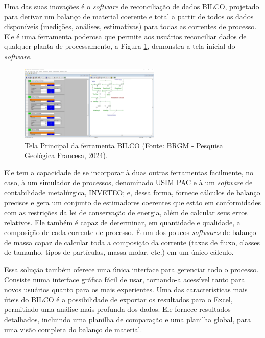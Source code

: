 Uma das suas inovações é o \textit{software} de reconciliação de dados BILCO, projetado para derivar um balanço de material coerente e total a partir de todos os dados disponíveis (medições, análises, estimativas) para todas as correntes de processo. Ele é uma ferramenta poderosa que permite aos usuários reconciliar dados de qualquer planta de processamento, a Figura \ref{fig:BILCO}, demonstra a tela inicial do \textit{software}.

\begin{figure}[htbp!]
	\centering
	\includegraphics[width=0.6\textwidth]{figuras/BILCOCASPEOP.png}
	\caption{Tela Principal da ferramenta BILCO (Fonte: BRGM - Pesquisa Geológica Francesa, 2024).}
	\label{fig:BILCO}
\end{figure}

Ele tem a capacidade de se incorporar à duas outras ferramentas facilmente, no caso, à um simulador de processos, denominado USIM PAC e à um \textit{software} de contabilidade metalúrgica, INVETEO; e, dessa forma, fornece cálculos de balanço precisos e gera um conjunto de estimadores coerentes que estão em conformidades com as restrições da lei de conservação de energia, além de calcular seus erros relativos. Ele também é capaz de determinar, em quantidade e qualidade, a composição de cada corrente de processo. É um dos poucos \textit{softwares} de balanço de massa capaz de calcular toda a composição da corrente (taxas de fluxo, classes de tamanho, tipos de partículas, massa molar, etc.) em um único cálculo.

Essa solução também oferece uma única interface para gerenciar todo o processo. Consiste numa interface gráfica fácil de usar, tornando-a acessível tanto para novos usuários quanto para os mais experientes. Uma das características mais úteis do BILCO é a possibilidade de exportar os resultados para o Excel, permitindo uma análise mais profunda dos dados. Ele fornece resultados detalhados, incluindo uma planilha de comparação e uma planilha global, para uma visão completa do balanço de material.

